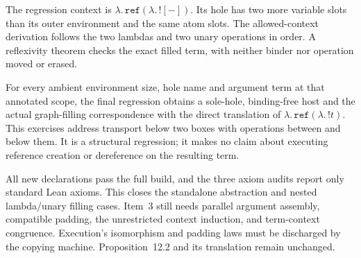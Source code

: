 The regression context is
$\lambda.\,\mathtt{ref}(\lambda.\,![-])$.
Its hole has two more variable slots than its outer environment and the
same atom slots. The allowed-context derivation follows the two lambdas and
two unary operations in order. A reflexivity theorem checks the exact filled
term, with neither binder nor operation moved or erased.

For every ambient environment size, hole name and argument term at that
annotated scope, the final regression obtains a sole-hole, binding-free host
and the actual graph-filling correspondence with the direct translation of
$\lambda.\,\mathtt{ref}(\lambda.\,!t)$.
This exercises address transport below two boxes with operations between
and below them. It is a structural regression; it makes no claim about
executing reference creation or dereference on the resulting term.









All new declarations pass the full build, and the three axiom audits report
only standard Lean axioms. This closes the standalone abstraction and nested
lambda/unary filling cases. Item~3 still needs parallel argument assembly,
compatible padding, the unrestricted context induction, and term-context
congruence. Execution's isomorphism and padding laws must be discharged by
the copying machine. Proposition~12.2 and its translation remain unchanged.
